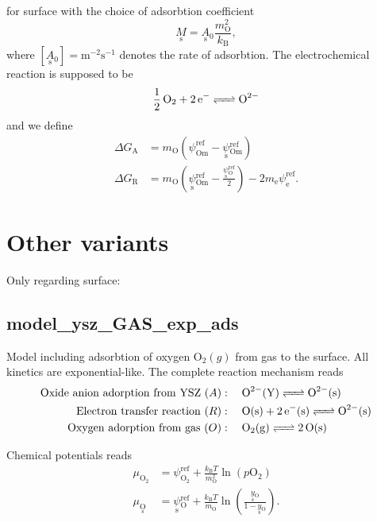 \documentclass{article}
\numberwithin{equation}{section}
\newcommand{\us}[1]{\underset{\textrm{s}}{#1}{}}
\def\kB{k_\mathrm{B}}
\def\Ox{\mathrm{O}}
\def\OO{\mathrm{O}_2}
\def\yOs{\us y_\textrm{O}}
\def\pO2{p\OO}
\def\DGA{\Delta G_\textrm{A}  }
\def\DGR{\Delta G_\textrm{R}  }
\def\REF{\textrm{ref}}
\begin{document}
for surface with the choice of adsorbtion coefficient
$$
\us M = \us A_0  \frac{m_\Ox^2}{\kB},
$$
where $[\us A_0] = \textrm{m}^{-2} \textrm{s}^{-1}$ denotes the rate of adsorbtion. The electrochemical reaction is supposed to be
\begin{align}
\ce{\frac{1}{2} \Ox_2 + 2\textrm{e}^- <=> \Ox^{2-}}
\end{align}
and we define
\begin{subequations}
\begin{align}
\DGA
&=
m_\Ox
\left(
	\psi_{\textrm{Om}}^\REF
	-
	\us \psi_{\textrm{Om}}^\REF
\right)
\\
\DGR
&= 
m_\Ox
\left(
	\us \psi_{\textrm{Om}}^\REF
	-
	\frac{\us \psi_{\Ox}^\REF}{2}
\right)
-
2 m_\textrm{e} \psi_{\textrm{e}}^\REF.
\end{align}
\end{subequations}




\section{Other variants}
Only regarding surface:

\def\surf{\mathrm{s}}
\def\Y{\mathrm{Y}}
\def\gas{\mathrm{g}}
\subsection{model\_ysz\_GAS\_exp\_ads}
Model including adsorbtion of oxygen $\mathrm{O}_2(g)$ from gas to the surface. All kinetics are exponential-like. The complete reaction mechanism reads
\begin{subequations}
\begin{align}
\mathrm{Oxide \ anion \ adorption \ from \ YSZ} \ (A) &: \quad 
\ce{\Ox^{2-}(\Y) <=> \Ox^{2-}(\surf)}
\\
\mathrm{Electron \ transfer \ reaction}\ (R) &: \quad 
\ce{\textrm{O}(\surf) +  2\textrm{e}^-(\surf) <=> \Ox^{2-}(\surf)}
\\
\mathrm{Oxygen \ adorption \ from \ gas}\  (O) &: \quad 
\ce{\Ox_2({\gas}) <=> 2 \Ox(\surf)}
\\
\end{align}
\end{subequations}

Chemical potentials reads
\begin{subequations}
\begin{align}
\mu_{\OO} &= \psi_{\OO}^\REF + \frac{\kB T}{m_\Ox^2}\ln 
\left( 
	\pO2 
\right)
\\
\mu_{\us \Ox} 
&= 
\us \psi_{\Ox}^\REF 
+ 
\frac{\kB T}{m_\Ox} \ln 
\left(  
	\frac{\yOs}{1-\yOs}
\right).
\end{align}
\end{subequations}
\end{document}
